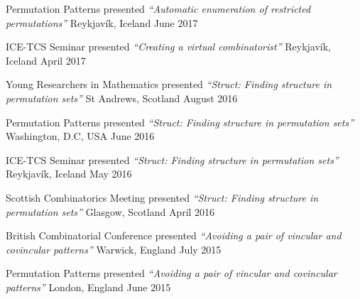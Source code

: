 \begin{cvhonors}
\cvhonor
  {Permutation Patterns} %
  {presented \textit{``Automatic enumeration of restricted permutations''}} %
  {Reykjavík, Iceland} %
  {June 2017} %


\cvhonor
  {ICE-TCS Seminar} %
  {presented \textit{``Creating a virtual combinatorist''}} %
  {Reykjavík, Iceland} %
  {April 2017} %


\cvhonor
  {Young Researchers in Mathematics} %
  {presented \textit{``Struct: Finding structure in permutation sets''}} %
  {St Andrews, Scotland} %
  {August 2016} %


\cvhonor
  {Permutation Patterns} %
  {presented \textit{``Struct: Finding structure in permutation sets''}} %
  {Washington, D.C, USA} %
  {June 2016} %


\cvhonor
  {ICE-TCS Seminar} %
  {presented \textit{``Struct: Finding structure in permutation sets''}} %
  {Reykjavík, Iceland} %
  {May 2016} %


\cvhonor
  {Scottish Combinatorics Meeting} %
  {presented \textit{``Struct: Finding structure in permutation sets''}} %
  {Glasgow, Scotland} %
  {April 2016} %


\cvhonor
  {British Combinatorial Conference} %
  {presented \textit{``Avoiding a pair of vincular and covincular patterns''}} %
  {Warwick, England} %
  {July 2015} %


\cvhonor
  {Permutation Patterns} %
  {presented \textit{``Avoiding a pair of vincular and covincular patterns''}} %
  {London, England} %
  {June 2015} %



\end{cvhonors}
